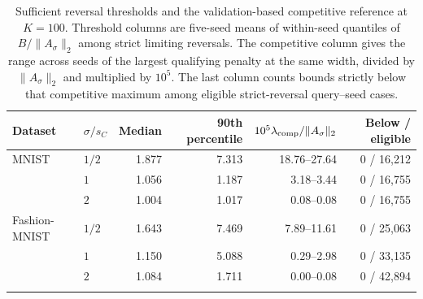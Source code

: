 \begin{table}[!htbp]
\centering\small
\caption{Sufficient reversal thresholds and the validation-based competitive reference at $K=100$. Threshold columns are five-seed means of within-seed quantiles of $B/\|A_\sigma\|_2$ among strict limiting reversals. The competitive column gives the range across seeds of the largest qualifying penalty at the same width, divided by $\|A_\sigma\|_2$ and multiplied by $10^5$. The last column counts bounds strictly below that competitive maximum among eligible strict-reversal query--seed cases.}
\label{tab:r3-thresholds}
\begin{tabular}{@{}llrrrr@{}}
\toprule
Dataset & $\sigma/s_C$ & Median & 90th percentile & $10^5\lambda_{\rm comp}/\|A_\sigma\|_2$ & Below / eligible\\
\midrule
MNIST & $1/2$ & 1.877 & 7.313 & 18.76--27.64 & 0 / 16,212 \\
 & $1$ & 1.056 & 1.187 & 3.18--3.44 & 0 / 16,755 \\
 & $2$ & 1.004 & 1.017 & 0.08--0.08 & 0 / 16,755 \\
\addlinespace
Fashion-MNIST & $1/2$ & 1.643 & 7.469 & 7.89--11.61 & 0 / 25,063 \\
 & $1$ & 1.150 & 5.088 & 0.29--2.98 & 0 / 33,135 \\
 & $2$ & 1.084 & 1.711 & 0.00--0.08 & 0 / 42,894 \\
\addlinespace
\bottomrule
\end{tabular}
\end{table}
